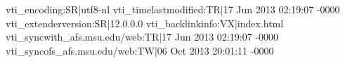vti_encoding:SR|utf8-nl
vti_timelastmodified:TR|17 Jun 2013 02:19:07 -0000
vti_extenderversion:SR|12.0.0.0
vti_backlinkinfo:VX|index.html
vti_syncwith_afs.msu.edu/web:TR|17 Jun 2013 02:19:07 -0000
vti_syncofs_afs.msu.edu/web:TW|06 Oct 2013 20:01:11 -0000
